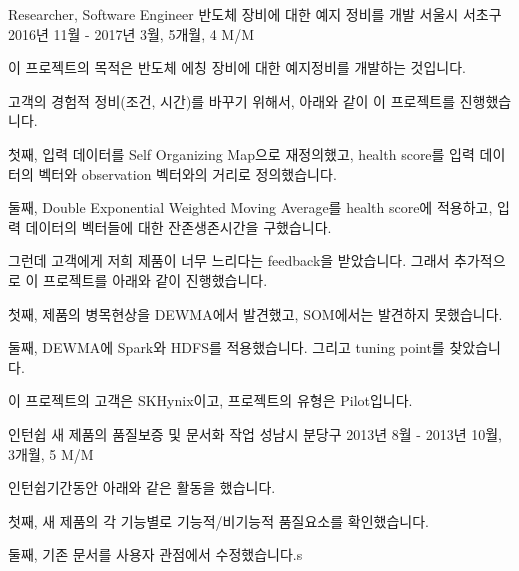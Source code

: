 \begin{cventries}
  \cventry
    {Researcher, Software Engineer} %
    {반도체 장비에 대한 예지 정비를 개발} %
    {서울시 서초구} %
    {2016년 11월 - 2017년 3월, 5개월, 4 M/M} %
    {
      \begin{cvitems} %
        \item {이 프로젝트의 목적은 반도체 에칭 장비에 대한 예지정비를 개발하는 것입니다.}
        \item {고객의 경험적 정비(조건, 시간)를 바꾸기 위해서, 아래와 같이 이 프로젝트를 진행했습니다.}
        \item {첫째, 입력 데이터를 Self Organizing Map으로 재정의했고, health score를 입력 데이터의 벡터와 observation 벡터와의 거리로 정의했습니다.}
        \item {둘째, Double Exponential Weighted Moving Average를 health score에 적용하고, 입력 데이터의 벡터들에 대한 잔존생존시간을 구했습니다.}
        \item {그런데 고객에게 저희 제품이 너무 느리다는 feedback을 받았습니다. 그래서 추가적으로 이 프로젝트를 아래와 같이 진행했습니다.}
        \item {첫째, 제품의 병목현상을 DEWMA에서 발견했고, SOM에서는 발견하지 못했습니다.}
        \item {둘째, DEWMA에 Spark와 HDFS를 적용했습니다. 그리고 tuning point를 찾았습니다.}
        \item {이 프로젝트의 고객은 SKHynix이고, 프로젝트의 유형은 Pilot입니다.}
      \end{cvitems}
    }

  \cventry
    {인턴쉽} %
    {새 제품의 품질보증 및 문서화 작업} %
    {성남시 분당구} %
    {2013년 8월 - 2013년 10월, 3개월, 5 M/M} %
    {
      \begin{cvitems} %
        \item {인턴쉽기간동안 아래와 같은 활동을 했습니다.}
        \item {첫째, 새 제품의 각 기능별로 기능적/비기능적 품질요소를 확인했습니다.}
        \item {둘째, 기존 문서를 사용자 관점에서 수정했습니다.s}
      \end{cvitems}
    }

\end{cventries}
